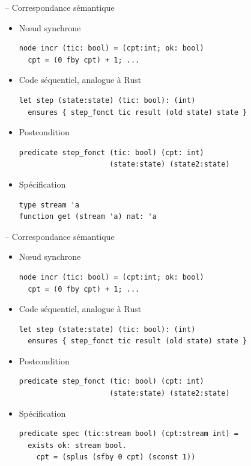 \documentclass[11pt,usenames,dvipsnames]{beamer}
\begin{document}
\begin{frame}[fragile]{-- Correspondance sémantique}
\begin{itemize}
\item Nœud synchrone
  \begin{lstlisting}[language=minils]
node incr (tic: bool) = (cpt:int; ok: bool)
  cpt = (0 fby cpt) + 1; ...\end{lstlisting}
\item Code séquentiel, analogue à Rust 
  \begin{lstlisting}[language=why3]
let step (state:state) (tic: bool): (int) 
  ensures { step_fonct tic result (old state) state }\end{lstlisting}
\item Postcondition
  \begin{lstlisting}[language=why3]
predicate step_fonct (tic: bool) (cpt: int)
					 (state:state) (state2:state)\end{lstlisting}
\item Spécification
  \begin{lstlisting}[language=why3]
type stream 'a
function get (stream 'a) nat: 'a
\end{lstlisting}

\end{itemize}
\end{frame}

\begin{frame}[fragile]{-- Correspondance sémantique}
\begin{itemize}
\item Nœud synchrone
  \begin{lstlisting}[language=minils]
node incr (tic: bool) = (cpt:int; ok: bool)
  cpt = (0 fby cpt) + 1; ...\end{lstlisting}
\item Code séquentiel, analogue à Rust 
  \begin{lstlisting}[language=why3]
let step (state:state) (tic: bool): (int) 
  ensures { step_fonct tic result (old state) state }\end{lstlisting}
\item Postcondition
  \begin{lstlisting}[language=why3]
predicate step_fonct (tic: bool) (cpt: int)
					 (state:state) (state2:state)\end{lstlisting}
\item Spécification
  \begin{lstlisting}[language=why3]
predicate spec (tic:stream bool) (cpt:stream int) =
  exists ok: stream bool.
    cpt = (splus (sfby 0 cpt) (sconst 1))\end{lstlisting}

\end{itemize}
\end{frame}
\end{document}
